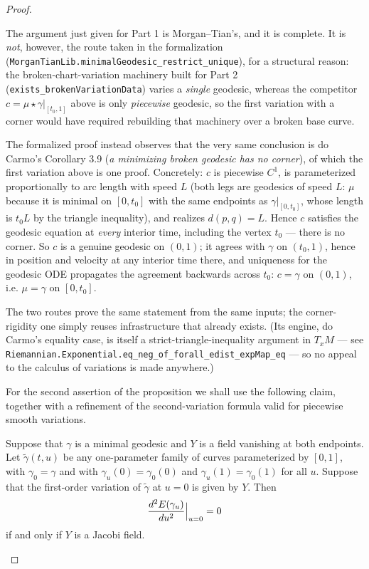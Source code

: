 \begin{proof}
\begin{remark}
The argument just given for Part 1 is Morgan--Tian's, and it is complete.  It is
\emph{not}, however, the route taken in the formalization
(\texttt{MorganTianLib.minimalGeodesic\_restrict\_unique}), for a structural reason: the
broken-chart-variation machinery built for Part 2
(\texttt{exists\_brokenVariationData}) varies a \emph{single} geodesic, whereas the
competitor $c=\mu\star\gamma|_{[t_0,1]}$ above is only \emph{piecewise} geodesic, so the
first variation with a corner would have required rebuilding that machinery over a broken
base curve.

The formalized proof instead observes that the very same conclusion is do Carmo's
Corollary 3.9 (\emph{a minimizing broken geodesic has no corner}), of which the first
variation above is one proof.  Concretely: $c$ is piecewise $C^1$, is parameterized
proportionally to arc length with speed $L$ (both legs are geodesics of speed $L$: $\mu$
because it is minimal on $[0,t_0]$ with the same endpoints as $\gamma|_{[0,t_0]}$, whose
length is $t_0L$ by the triangle inequality), and realizes $d(p,q)=L$.  Hence $c$
satisfies the geodesic equation at \emph{every} interior time, including the vertex
$t_0$ --- there is no corner.  So $c$ is a genuine geodesic on $(0,1)$; it agrees with
$\gamma$ on $(t_0,1)$, hence in position and velocity at any interior time there, and
uniqueness for the geodesic ODE propagates the agreement backwards across $t_0$: $c=\gamma$
on $(0,1)$, i.e. $\mu=\gamma$ on $[0,t_0]$.

The two routes prove the same statement from the same inputs; the corner-rigidity one
simply reuses infrastructure that already exists.  (Its engine, do Carmo's equality case,
is itself a strict-triangle-inequality argument in $T_xM$ --- see
\texttt{Riemannian.Exponential.eq\_neg\_of\_forall\_edist\_expMap\_eq} --- so no appeal to
the calculus of variations is made anywhere.)
\end{remark}

For the second assertion of the proposition we shall use the
following claim, together with a refinement of the second-variation
formula valid for piecewise smooth variations.

\begin{lemma}
\label{claim:second-variation-minimal-geodesic}

Suppose that $\gamma$ is a minimal geodesic and $Y$ is a field
vanishing at both endpoints. Let $\tilde\gamma(t,u)$ be any
one-parameter family of curves parameterized by $[0,1]$, with
$\gamma_0=\gamma$ and with $\gamma_u(0)=\gamma_0(0)$ and
$\gamma_u(1)=\gamma_0(1)$ for all $u$.
Suppose that the first-order variation of $\tilde \gamma$ at $u=0$
is given by $Y$. Then
$$\frac{d^2E(\gamma_u)}{du^2}\Bigl|_{u=0}\Bigr.=0$$
if and only if $Y$ is a Jacobi field.
\end{lemma}


\end{proof}
